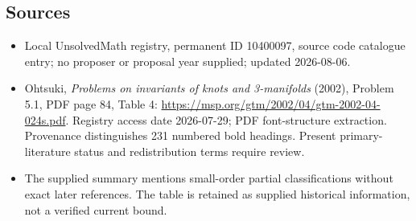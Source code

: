 \documentclass[11pt]{article}
\begin{document}
\subsection{Sources}
\begin{itemize}
\item Local UnsolvedMath registry, permanent ID 10400097, source code catalogue entry; no proposer or proposal year supplied; updated 2026-08-06.
\item Ohtsuki, \emph{Problems on invariants of knots and 3-manifolds} (2002), Problem 5.1, PDF page 84, Table 4: \url{https://msp.org/gtm/2002/04/gtm-2002-04-024s.pdf}. Registry access date 2026-07-29; PDF font-structure extraction. Provenance distinguishes 231 numbered bold headings. Present primary-literature status and redistribution terms require review.
\item The supplied summary mentions small-order partial classifications without exact later references. The table is retained as supplied historical information, not a verified current bound.
\end{itemize}
\end{document}
